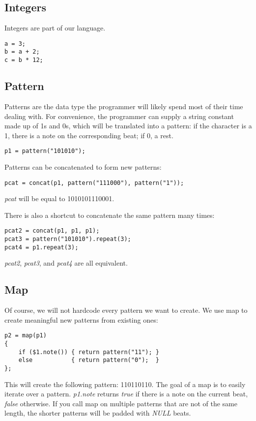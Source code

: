 \subsection{Integers}
Integers are part of our language.
\begin{verbatim}
a = 3;
b = a + 2;
c = b * 12;
\end{verbatim}

\subsection{Pattern}
Patterns are the data type the programmer will likely spend most of their time dealing with.
For convenience, the programmer can supply a string constant made up of 1s and 0s, which will be translated into a pattern:
if the character is a 1, there is a note on the corresponding beat; if 0, a rest.
\begin{verbatim}
p1 = pattern("101010");
\end{verbatim}
Patterns can be concatenated to form new patterns:
\begin{verbatim}
pcat = concat(p1, pattern("111000"), pattern("1"));
\end{verbatim}
\textit{pcat} will be equal to 1010101110001.

There is also a shortcut to concatenate the same pattern many times:
\begin{verbatim}
pcat2 = concat(p1, p1, p1);
pcat3 = pattern("101010").repeat(3);
pcat4 = p1.repeat(3);
\end{verbatim}
\textit{pcat2}, \textit{pcat3}, and \textit{pcat4} are all equivalent.

\subsection{Map}
Of course, we will not hardcode every pattern we want to create. We use
map to create meaningful new patterns from existing ones:
\begin{verbatim}
p2 = map(p1)
{
    if ($1.note()) { return pattern("11"); }
    else           { return pattern("0");  }
};
\end{verbatim}
This will create the following pattern: 110110110. The goal of a map
is to easily iterate over a pattern. \textit{p1.note} returns
\textit{true} if there is a note on the current beat, \textit{false} otherwise.
If you call map on multiple patterns that are not of the same length,
the shorter patterns will be padded with \textit{NULL} beats.\\

